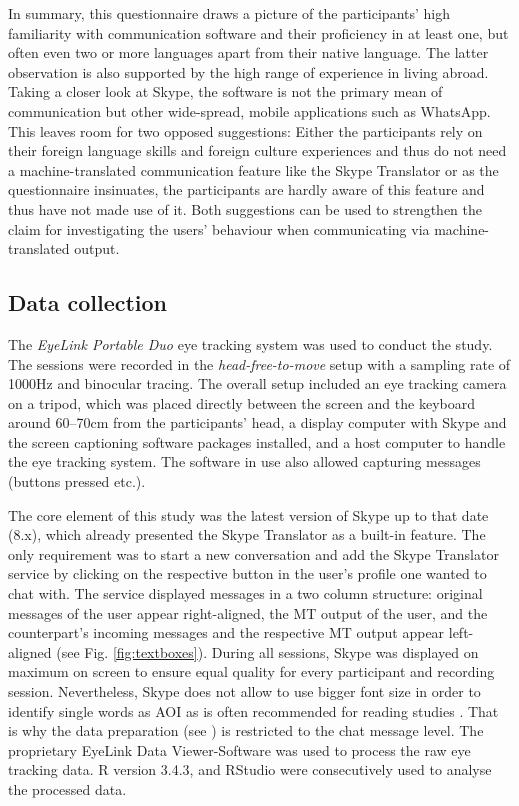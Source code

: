 \documentclass[output=paper,colorlinks,citecolor=brown]{langscibook}
\begin{document}
In summary, this questionnaire draws a picture of the participants' high familiarity with communication software and their proficiency in at least one, but often even two or more languages apart from their native language. The latter observation is also supported by the high range of experience in living abroad. Taking a closer look at Skype, the software is not the primary mean of communication but other wide-spread, mobile applications such as WhatsApp. This leaves room for two opposed suggestions: Either the participants rely on their foreign language skills and foreign culture experiences and thus do not need a machine-translated communication feature like the Skype Translator or as the questionnaire insinuates, the participants are hardly aware of this feature and thus have not made use of it. Both suggestions can be used to strengthen the claim for investigating the users' behaviour when communicating via machine-translated output.
 


\subsection{Data collection}
\label{subsec:datacol}


The \textit{EyeLink Portable Duo} eye tracking system was used to conduct the study. The sessions were recorded in the \textit{head-free-to-move} setup with a sampling rate of 1000Hz and binocular tracing. The overall setup included an eye tracking camera on a tripod, which was placed directly between the screen and the keyboard around 60--70cm from the participants' head, a display computer with Skype and the screen captioning software packages installed, and a host computer to handle the eye tracking system. The software in use also allowed capturing messages (buttons pressed etc.).

The core element of this study was the latest version of Skype up to that date (8.x), which already presented the Skype Translator as a built-in feature. The only requirement was to start a new conversation and add the Skype Translator service by clicking on the respective button in the user's profile one wanted to chat with. The service displayed messages in a two column structure: original messages of the user appear right-aligned, the MT output of the user, and the counterpart's incoming messages and the respective MT output appear left-aligned (see Fig. \ref{fig:textboxes}). During all sessions, Skype was displayed on maximum on screen to ensure equal quality for every participant and recording session. Nevertheless, Skype does not allow to use bigger font size in order to identify single words as AOI as is often recommended for reading studies \citep[cf.][261]{obrien_eye_2009}. That is why the data preparation (see ) is restricted to the chat message level. The proprietary EyeLink Data Viewer-Software \citep{sr_research_ltd_eyelink_2019} was used to process the raw eye tracking data. R version 3.4.3, \citep{r_development_core_team_r_2019} and RStudio were consecutively used to analyse the processed data.
\end{document}
